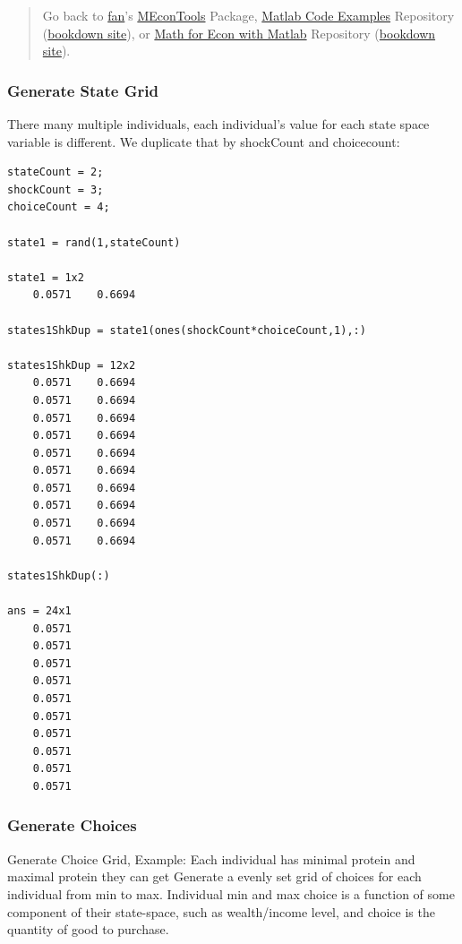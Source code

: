\documentclass[
]{book}
\begin{document}
\begin{quote}
Go back to \href{http://fanwangecon.github.io/}{fan}'s \href{https://fanwangecon.github.io/MEconTools/}{MEconTools} Package, \href{https://fanwangecon.github.io/M4Econ/}{Matlab Code Examples} Repository (\href{https://fanwangecon.github.io/M4Econ/bookdown}{bookdown site}), or \href{https://fanwangecon.github.io/Math4Econ/}{Math for Econ with Matlab} Repository (\href{https://fanwangecon.github.io/Math4Econ/bookdown}{bookdown site}).
\end{quote}

\hypertarget{generate-state-grid}{%
\subsubsection{\texorpdfstring{\textbf{Generate State Grid}}{Generate State Grid}}\label{generate-state-grid}}

There many multiple individuals, each individual's value for each state
space variable is different. We duplicate that by shockCount and
choicecount:

\begin{verbatim}
stateCount = 2;
shockCount = 3;
choiceCount = 4;

state1 = rand(1,stateCount)

state1 = 1x2    
    0.0571    0.6694

states1ShkDup = state1(ones(shockCount*choiceCount,1),:)

states1ShkDup = 12x2    
    0.0571    0.6694
    0.0571    0.6694
    0.0571    0.6694
    0.0571    0.6694
    0.0571    0.6694
    0.0571    0.6694
    0.0571    0.6694
    0.0571    0.6694
    0.0571    0.6694
    0.0571    0.6694

states1ShkDup(:)

ans = 24x1    
    0.0571
    0.0571
    0.0571
    0.0571
    0.0571
    0.0571
    0.0571
    0.0571
    0.0571
    0.0571
\end{verbatim}

\hypertarget{generate-choices}{%
\subsubsection{\texorpdfstring{\textbf{Generate Choices}}{Generate Choices}}\label{generate-choices}}

Generate Choice Grid, Example: Each individual has minimal protein and
maximal protein they can get Generate a evenly set grid of choices for
each individual from min to max. Individual min and max choice is a
function of some component of their state-space, such as wealth/income
level, and choice is the quantity of good to purchase.
\end{document}
